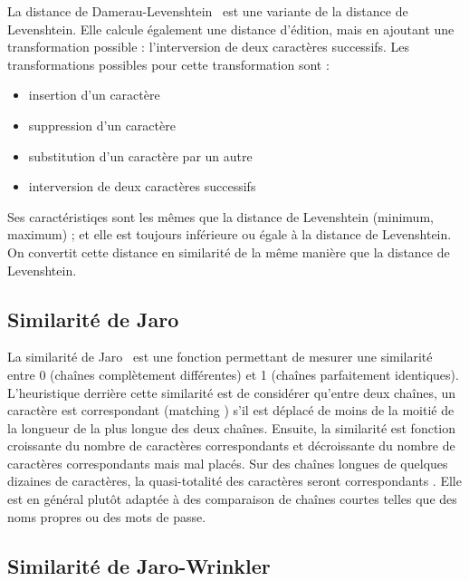             La distance de Damerau-Levenshtein~\cite{damerau_levenshtein_wiki} est une variante de la distance de Levenshtein.
            Elle calcule également une distance d'édition, mais en ajoutant une transformation possible : l'interversion de deux caractères successifs.
            Les transformations possibles pour cette transformation sont :
            \begin{itemize}
                \item insertion d'un caractère 
                \item suppression d'un caractère
                \item substitution d'un caractère par un autre
                \item interversion de deux caractères successifs
            \end{itemize}
            Ses caractéristiqes sont les mêmes que la distance de Levenshtein (minimum, maximum) ; et elle est toujours inférieure ou égale à la distance de Levenshtein.
            On convertit cette distance en similarité de la même manière que la distance de Levenshtein.

            \subsection{Similarité de Jaro}
            
            La similarité de Jaro~\cite{jaro_wiki} est une fonction permettant de mesurer une similarité entre 0 (chaînes complètement différentes) et 1 (chaînes parfaitement identiques).
            L'heuristique derrière cette similarité est de considérer qu'entre deux chaînes, un caractère est \og correspondant \fg (\og matching \fg) s'il est déplacé de moins de la moitié de la longueur de la plus longue des deux chaînes.
            Ensuite, la similarité est fonction croissante du nombre de caractères \og correspondants \fg et décroissante du nombre de caractères \og correspondants \fg mais mal placés.
            Sur des chaînes longues de quelques dizaines de caractères, la quasi-totalité des caractères seront \og correspondants \fg.
            Elle est en général plutôt adaptée à des comparaison de chaînes courtes telles que des noms propres ou des mots de passe.

            \subsection{Similarité de Jaro-Wrinkler}
            
